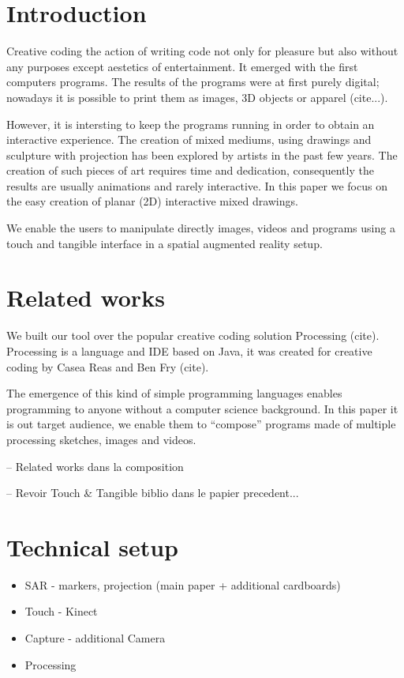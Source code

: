 \documentclass{sigchi}
\begin{document}
\section{Introduction}

Creative coding the
action of writing code not only for pleasure but also without any
purposes except aestetics of entertainment.  It emerged with the first
computers programs. The results of the programs were at first purely
digital; nowadays it is possible to print them as images, 3D objects
or apparel (cite...).

However, it is intersting to keep the programs running in order to obtain an
interactive experience. The creation of mixed mediums, using drawings
and sculpture with projection has been explored by artists in the past
few years. The creation of such pieces of art requires time and
dedication, consequently the results are usually animations and rarely
interactive. In this paper we focus on the easy creation of planar
(2D) interactive mixed drawings. 

We enable the users to manipulate 
directly images, videos and programs using a touch and tangible
interface in a spatial augmented reality setup. 

\section{Related works}

We built our tool over the popular creative coding solution
Processing (cite). Processing is a language and IDE based on Java, it
was created for creative coding by Casea Reas and Ben Fry (cite). 

The emergence of this kind of simple programming languages enables
programming to anyone without a computer science background. 
In this paper it is out target audience, we enable them to ``compose'' 
programs made of multiple processing sketches, images and videos. 

-- Related works dans la composition 

-- Revoir Touch \& Tangible biblio dans le papier precedent... 


\section{Technical setup}



\begin{itemize}
\item SAR - markers, projection  (main paper + additional cardboards)
\item Touch - Kinect
\item Capture - additional Camera	 
\item Processing
\end{itemize}
\end{document}
